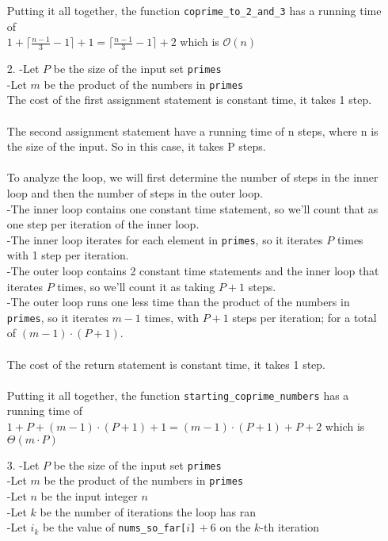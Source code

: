 \documentclass[fontsize=11pt]{article}
\newcommand{\cO}{\mathcal{O}}
\begin{document}
\begin{enumerate}
Putting it all together, the function \texttt{coprime\_to\_2\_and\_3} has a running time of \\
$1 + \lceil\frac{n - 1}{3} - 1\rceil + 1 = \lceil\frac{n - 1}{3} - 1\rceil + 2$ which is $\cO(n)$

\item[2.]
-Let $P$ be the size of the input set \texttt{primes}  \\
-Let $m$ be the product of the numbers in \texttt{primes} \\

The cost of the first assignment statement is constant time, it takes 1 step. \\~\\

The second assignment statement have a running time of n steps, where n is the size of the input. So in this case, it takes P steps. \\~\\

To analyze the loop, we will first determine the number of steps in the inner loop and then the number of steps in the outer loop. \\
-The inner loop contains one constant time statement, so we'll count that as one step per iteration of the inner loop. \\
-The inner loop iterates for each element in \texttt{primes}, so it iterates $P$ times with 1 step per iteration. \\
-The outer loop contains 2 constant time statements and the inner loop that iterates $P$ times, so we'll count it as taking $P + 1$ steps. \\
-The outer loop runs one less time than the product of the numbers in \texttt{primes}, so it iterates $m -1$ times, with $P + 1$ steps per iteration; for a total of $(m - 1) \cdot (P + 1)$. \\~\\

The cost of the return statement is constant time, it takes 1 step. \\~\\

Putting it all together, the function \texttt{starting\_coprime\_numbers} has a running time of \\
$1 + P + (m - 1) \cdot (P + 1) + 1 = (m - 1) \cdot (P + 1) + P + 2$ which is $\Theta(m \cdot P)$

\item[3.]
-Let $P$ be the size of the input set \texttt{primes}  \\
-Let $m$ be the product of the numbers in \texttt{primes} \\
-Let $n$ be the input integer $n$ \\
-Let $k$ be the number of iterations the loop has ran \\
-Let $i_k$ be the value of \texttt{nums\_so\_far[$i$]} $+ ~6$ on the $k$-th iteration \\~\\


\end{enumerate}
\end{document}
